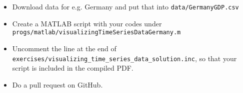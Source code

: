 \begin{enumerate}
\begin{itemize}
    \item Download data for e.g. Germany and put that into \texttt{data/GermanyGDP.csv}
    \item Create a MATLAB script with your codes under \texttt{progs/matlab/visualizingTimeSeriesDataGermany.m}
    \item Uncomment the line at the end of \texttt{exercises/visualizing\_time\_series\_data\_solution.inc},
    so that your script is included in the compiled PDF.    
    \item Do a pull request on GitHub.
\end{itemize}
%
\end{enumerate}